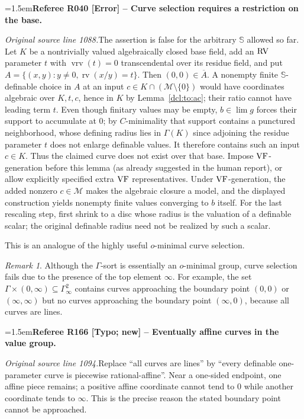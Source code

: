 \documentclass[12pt]{amsart}
\newcommand{\RefereeRemark}[4]{%
  \par\medskip\begingroup\normalfont\small\color{RefereePurple}%
  \emergencystretch=1.5em\noindent\textbf{Referee R#1 [#2] -- #3.}\par\nobreak\noindent #4\par
  \endgroup\medskip
}
\theoremstyle{plain}
\theoremstyle{definition}
\theoremstyle{remark}
\newtheorem{rem}[thm]{Remark}
\numberwithin{equation}{section}
\theoremstyle{plain}
\newcommand{\VF}{\textup{VF}}
\newcommand{\RV}{\textup{RV}}
\newcommand{\MM}{\mdl M}
\newcommand{\omin}{$o$\nobreakdash}
\newcommand{\0}{\emptyset}
\newcommand{\mdl}[1]{\mathcal{#1}}  %
\newcommand{\sub}{\subseteq}
\DeclareMathOperator{\rv}{rv}
\DeclareMathOperator{\vrv}{vrv}
\begin{document}
\RefereeRemark{040}{Error}{Curve selection requires a restriction on the base}{%
\textit{Original source line 1088.}\quad The assertion is false for the arbitrary $\mathbb S$ allowed so far. Let $K$ be a nontrivially valued algebraically closed base field, add an $\RV$ parameter $t$ with $\vrv(t)=0$ transcendental over its residue field, and put $A=\{(x,y):y\ne0,\rv(x/y)=t\}$. Then $(0,0)\in\overline A$. A nonempty finite $\mathbb S$-definable choice in $A$ at an input $c\in K\cap(\MM\setminus\{0\})$ would have coordinates algebraic over $K,t,c$, hence in $K$ by Lemma~\ref{dcl:to:ac}; their ratio cannot have leading term $t$. Even though finitary values may be empty, $b\in\lim g$ forces their support to accumulate at $0$; by $C$-minimality that support contains a punctured neighborhood, whose defining radius lies in $\Gamma(K)$ since adjoining the residue parameter $t$ does not enlarge definable values. It therefore contains such an input $c\in K$. Thus the claimed curve does not exist over that base. Impose $\VF$-generation before this lemma (as already suggested in the human report), or allow explicitly specified extra $\VF$ representatives. Under $\VF$-generation, the added nonzero $c\in\MM$ makes the algebraic closure a model, and the displayed construction yields nonempty finite values converging to $b$ itself. For the last rescaling step, first shrink to a disc whose radius is the valuation of a definable scalar; the original definable radius need not be realized by such a scalar.
}

This is an analogue of the highly useful \omin-minimal curve selection.

\begin{rem}
Although the $\Gamma$-sort is essentially an \omin-minimal group, curve selection fails due to the presence of the top element $\infty$. For example, the set $\Gamma \times (0, \infty) \sub  \Gamma^2_\infty$ contains curves approaching the boundary point $(0, 0)$ or $(\infty, \infty)$ but no curves approaching the boundary point $(\infty, 0)$, because all curves  are lines.
\end{rem}

\RefereeRemark{166}{Typo; new}{Eventually affine curves in the value group}{%
\textit{Original source line 1094.}\quad Replace ``all curves are lines'' by ``every definable one-parameter curve is piecewise rational-affine''. Near a one-sided endpoint, one affine piece remains; a positive affine coordinate cannot tend to $0$ while another coordinate tends to $\infty$. This is the precise reason the stated boundary point cannot be approached.
}
\end{document}
